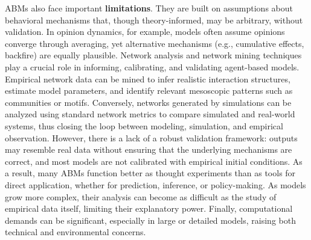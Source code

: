 \documentclass[11pt]{article}
\begin{document}
ABMs also face important \textbf{limitations}. 
They are built on assumptions about behavioral mechanisms that, though theory-informed, may be arbitrary, without validation. 
In opinion dynamics, for example, models often assume opinions converge through averaging, yet alternative mechanisms (e.g., cumulative effects, backfire) are equally plausible. 
Network analysis and network mining techniques play a crucial role in informing, calibrating, and validating agent-based models.
Empirical network data can be mined to infer realistic interaction structures, estimate model parameters, and identify relevant mesoscopic patterns such as communities or motifs.
Conversely, networks generated by simulations can be analyzed using standard network metrics to compare simulated and real-world systems, thus closing the loop between modeling, simulation, and empirical observation.
However, there is a lack of a robust validation framework: outputs may resemble real data without ensuring that the underlying mechanisms are correct, and most models are not calibrated with empirical initial conditions. 
As a result, many ABMs function better as thought experiments than as tools for direct application, whether for prediction, inference, or policy-making. 
As models grow more complex, their analysis can become as difficult as the study of empirical data itself, limiting their explanatory power. 
Finally, computational demands can be significant, especially in large or detailed models, raising both technical and environmental concerns. 
\end{document}
